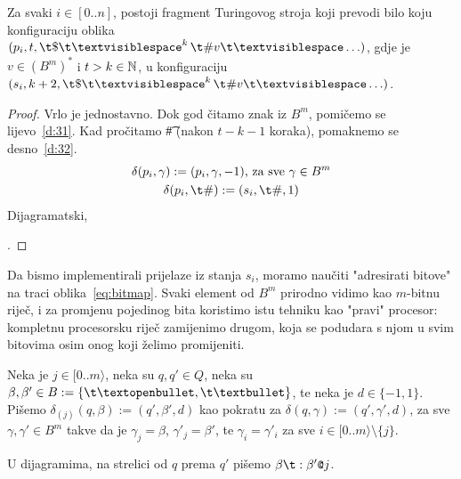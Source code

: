 \begin{lema}\label{lm:pi>si}
Za svaki $i\in[0..n]$, postoji fragment Turingovog stroja koji prevodi bilo koju konfiguraciju oblika $(p_i,t,\t\$\bl^k\,\t\#v\bl\ldots)$, gdje je $v\in(B^m)^*$ i $t>k\in{\mathbb N}$, u konfiguraciju $(s_i,k+2,\t\$\bl^k\,\t\#v\bl\ldots)$.
\end{lema}
\begin{proof}
Vrlo je jednostavno. Dok god čitamo znak iz $B^m$, pomičemo se lijevo~\eqref{d:31}. Kad pročitamo \t\# (nakon $t-k-1$ koraka), pomaknemo se desno~\eqref{d:32}.
\begin{gather}
\label{d:31}
    \delta(p_i,\gamma):=(p_i,\gamma,-1)\text{, za sve }\gamma\in B^m\\
\label{d:32}
    \delta(p_i,\t\#):=(s_i,\t\#,1)
\end{gather}
Dijagramatski,
\;.
\end{proof}


Da bismo implementirali prijelaze iz stanja $s_i$, moramo naučiti "adresirati bitove" na traci oblika~\eqref{eq:bitmap}. Svaki element od $B^m$ prirodno vidimo kao $m$-bitnu riječ, i za promjenu pojedinog bita koristimo istu tehniku kao "pravi" procesor: kompletnu procesorsku riječ zamijenimo drugom, koja se podudara s njom u svim bitovima osim onog koji želimo promijeniti.

\begin{definicija}\label{def:trag}
Neka je $j\in[0..m\rangle$, neka su $q,q'\in Q$, neka su $\beta,\beta'\in B:=\{\t\textopenbullet,\t\textbullet\}$, te neka je $d\in\{-1,1\}$. Pišemo $\delta_{(j)}(q,\beta):=(q',\beta',d)$ kao pokratu za
$\delta(q,\gamma):=(q',\gamma',d)$\text,
za sve $\gamma,\gamma'\in B^m$ takve da je $\gamma_j=\beta$, $\gamma'_j=\beta'$, te $\gamma_i=\gamma'_i$ za sve $i\in[0..m\rangle\setminus\{j\}$.

U dijagramima, na strelici od $q$ prema $q'$ pišemo $\beta\t:\beta'\texttt@j$.
\end{definicija}

